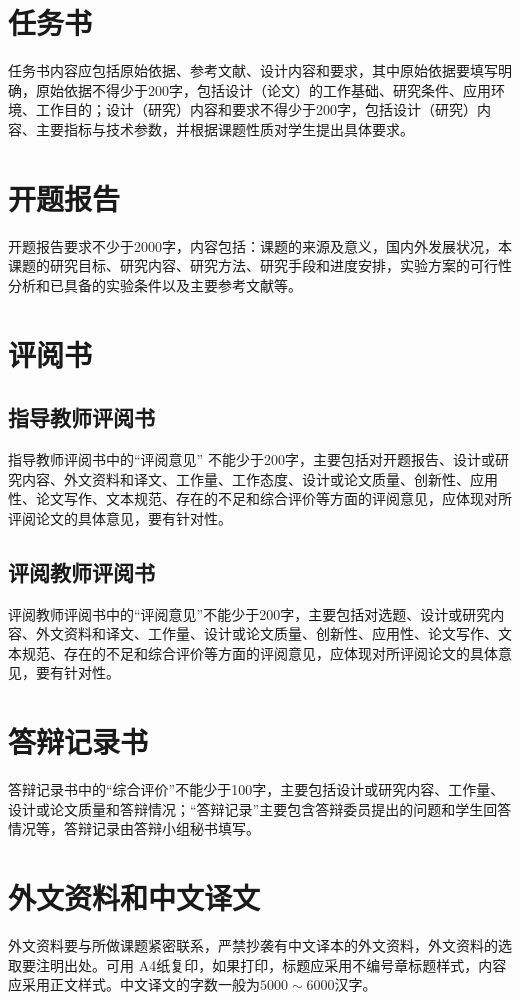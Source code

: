\section{任务书}
任务书内容应包括原始依据、参考文献、设计内容和要求，其中原始依据要填写明确，原始依据不得少于200字，包括设计（论文）的工作基础、研究条件、应用环境、工作目的；设计（研究）内容和要求不得少于200字，包括设计（研究）内容、主要指标与技术参数，并根据课题性质对学生提出具体要求。

\section{开题报告}
开题报告要求不少于2000字，内容包括：课题的来源及意义，国内外发展状况，本课题的研究目标、研究内容、研究方法、研究手段和进度安排，实验方案的可行性分析和已具备的实验条件以及主要参考文献等。

\section{评阅书}

\subsection{指导教师评阅书}

指导教师评阅书中的“评阅意见” 不能少于200字，主要包括对开题报告、设计或研究内容、外文资料和译文、工作量、工作态度、设计或论文质量、创新性、应用性、论文写作、文本规范、存在的不足和综合评价等方面的评阅意见，应体现对所评阅论文的具体意见，要有针对性。

\subsection{评阅教师评阅书}

评阅教师评阅书中的“评阅意见”不能少于200字，主要包括对选题、设计或研究内容、外文资料和译文、工作量、设计或论文质量、创新性、应用性、论文写作、文本规范、存在的不足和综合评价等方面的评阅意见，应体现对所评阅论文的具体意见，要有针对性。

\section{答辩记录书}

答辩记录书中的“综合评价”不能少于100字，主要包括设计或研究内容、工作量、设计或论文质量和答辩情况；“答辩记录”主要包含答辩委员提出的问题和学生回答情况等，答辩记录由答辩小组秘书填写。

\section{外文资料和中文译文}

外文资料要与所做课题紧密联系，严禁抄袭有中文译本的外文资料，外文资料的选取要注明出处。可用 A4纸复印，如果打印，标题应采用不编号章标题样式，内容应采用正文样式。中文译文的字数一般为$5000\sim 6000$汉字。